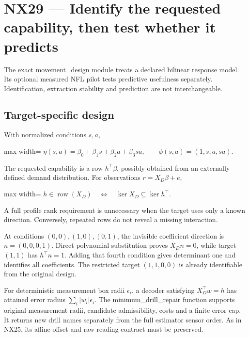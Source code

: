 \documentclass[
  11pt,
  a4paper,
]{report}
\begin{document}
\hypertarget{nx29-identify-the-requested-capability-then-test-whether-it-predicts}{%
\chapter{NX29 --- Identify the requested capability, then test whether
it
predicts}\label{nx29-identify-the-requested-capability-then-test-whether-it-predicts}}

The exact movement\_design module treats a declared bilinear response
model. Its optional measured NFL pilot tests predictive usefulness
separately. Identification, extraction stability and prediction are not
interchangeable.

\hypertarget{target-specific-design}{%
\section{Target-specific design}\label{target-specific-design}}

With normalized conditions \(s,a\), \begin{center}
\begin{adjustbox}{max width=\linewidth}
$\displaystyle
\eta(s,a)=\beta_0+\beta_1s+\beta_2a+\beta_3sa,\qquad
\phi(s,a)=(1,s,a,sa).
$
\end{adjustbox}
\end{center} The requested capability is a row \(h^\top\beta\), possibly obtained
from an externally defined demand distribution. For observations
\(r=X_D\beta+e\), \begin{center}
\begin{adjustbox}{max width=\linewidth}
$\displaystyle
h\in\operatorname{row}(X_D)
\quad\Longleftrightarrow\quad
\ker X_D\subseteq\ker h^\top.
$
\end{adjustbox}
\end{center} A full profile rank requirement is unnecessary when the target uses
only a known direction. Conversely, repeated rows do not reveal a
missing interaction.

At conditions \((0,0),(1,0),(0,1)\), the invisible coefficient direction
is \(n=(0,0,0,1)\). Direct polynomial substitution proves \(X_Dn=0\),
while target \((1,1)\) has \(h^\top n=1\). Adding that fourth condition
gives determinant one and identifies all coefficients. The restricted
target \((1,1,0,0)\) is already identifiable from the original design.

For deterministic measurement box radii \(\epsilon_i\), a decoder
satisfying \(X_D^\top w=h\) has attained error radius
\(\sum_i|w_i|\epsilon_i\). The minimum\_drill\_repair function supports
original measurement radii, candidate admissibility, costs and a finite
error cap. It returns new drill names separately from the full estimator
sensor order. As in NX25, its affine offset and raw-reading contract
must be preserved.
\end{document}
